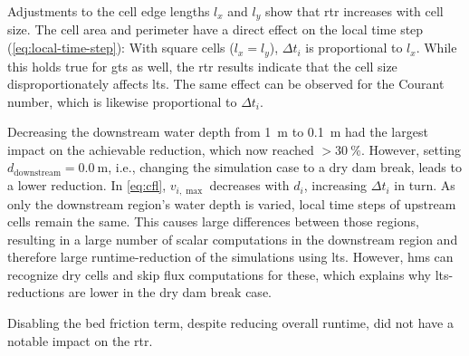 Adjustments to the cell edge lengths $l_x$ and $l_y$ show that \gls{rtr} increases with cell size.
The cell area and perimeter have a direct effect on the local time step (\autoref{eq:local-time-step}): 
With square cells ($l_x = l_y$), 
$\Delta t_i$ is proportional to $l_x$.
While this holds true for \gls{gts} as well,
the \gls{rtr} results indicate that the cell size disproportionately affects \gls{lts}. 
The same effect can be observed for the Courant number, which is likewise proportional to $\Delta t_i$.

Decreasing the downstream water depth from \SI{1}{\meter} to \SI{0.1}{\meter} had the largest impact on the achievable reduction, which now reached $>\SI{30}{\percent}$. 
However, setting $d_{\text{downstream}} = \SI{0.0}{\meter}$, i.e., changing the simulation case to a dry dam break, leads to a lower reduction.
In \autoref{eq:cfl}, $v_{i,\max}$ decreases with $d_i$, increasing $\Delta t_i$ in turn.
As only the downstream region's water depth is varied, local time steps of upstream cells remain the same.
This causes large differences between those regions, resulting in a large number of scalar computations in the downstream region and therefore large runtime-reduction of the simulations using \gls{lts}.
However, \gls{hms} can recognize dry cells and skip flux computations for these, which explains why \gls{lts}-reductions are lower in the dry dam break case.

Disabling the bed friction term, despite reducing overall runtime, did not have a notable impact on the \gls{rtr}.

